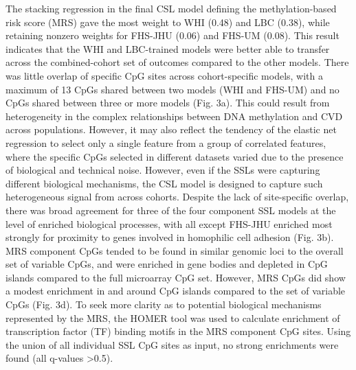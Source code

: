 \documentclass[]{article}
\begin{document}
The stacking regression in the final CSL model defining the
methylation-based risk score (MRS) gave the most weight to WHI (0.48)
and LBC (0.38), while retaining nonzero weights for FHS-JHU (0.06) and
FHS-UM (0.08). This result indicates that the WHI and LBC-trained models
were better able to transfer across the combined-cohort set of outcomes
compared to the other models. There was little overlap of specific CpG
sites across cohort-specific models, with a maximum of 13 CpGs shared
between two models (WHI and FHS-UM) and no CpGs shared between three or
more models (Fig. 3a). This could result from heterogeneity in the
complex relationships between DNA methylation and CVD across
populations. However, it may also reflect the tendency of the elastic
net regression to select only a single feature from a group of
correlated features, where the specific CpGs selected in different
datasets varied due to the presence of biological and technical noise.
However, even if the SSLs were capturing different biological
mechanisms, the CSL model is designed to capture such heterogeneous
signal from across cohorts. Despite the lack of site-specific overlap,
there was broad agreement for three of the four component SSL models at
the level of enriched biological processes, with all except FHS-JHU
enriched most strongly for proximity to genes involved in homophilic
cell adhesion (Fig. 3b). MRS component CpGs tended to be found in
similar genomic loci to the overall set of variable CpGs, and were
enriched in gene bodies and depleted in CpG islands compared to the full
microarray CpG set. However, MRS CpGs did show a modest enrichment in
and around CpG islands compared to the set of variable CpGs (Fig. 3d).
To seek more clarity as to potential biological mechanisms represented
by the MRS, the HOMER tool was used to calculate enrichment of
transcription factor (TF) binding motifs in the MRS component CpG sites.
Using the union of all individual SSL CpG sites as input, no strong
enrichments were found (all q-values \textgreater{}0.5).
\end{document}
